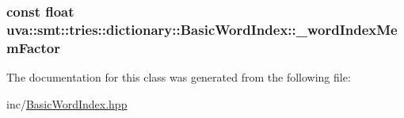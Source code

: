 \subsubsection[{\+\_\+word\+Index\+Mem\+Factor}]{\setlength{\rightskip}{0pt plus 5cm}const float uva\+::smt\+::tries\+::dictionary\+::\+Basic\+Word\+Index\+::\+\_\+word\+Index\+Mem\+Factor\hspace{0.3cm}{\ttfamily [protected]}}\label{classuva_1_1smt_1_1tries_1_1dictionary_1_1_basic_word_index_a4efb17e8e41fbd432db6e0472df193ad}


The documentation for this class was generated from the following file\+:\begin{DoxyCompactItemize}
\item 
inc/\hyperlink{_basic_word_index_8hpp}{Basic\+Word\+Index.\+hpp}\end{DoxyCompactItemize}
